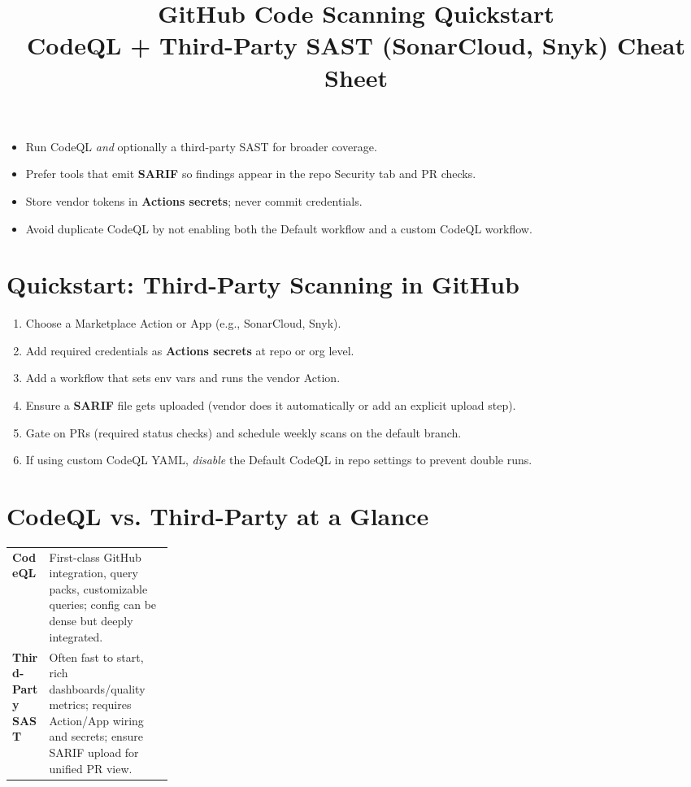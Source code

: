 \documentclass[11pt]{article}
\title{\vspace{-1.0em}GitHub Code Scanning Quickstart\\
\large CodeQL + Third-Party SAST (SonarCloud, Snyk) Cheat Sheet\vspace{-0.3em}}
\author{}
\date{}
\begin{document}
\maketitle

\begin{tcolorbox}[title=TL;DR, colframe=OliveGreen]
\begin{itemize}
  \item Run CodeQL \emph{and} optionally a third-party SAST for broader coverage.
  \item Prefer tools that emit \textbf{SARIF} so findings appear in the repo Security tab and PR checks.
  \item Store vendor tokens in \textbf{Actions secrets}; never commit credentials.
  \item Avoid duplicate CodeQL by not enabling both the Default workflow and a custom CodeQL workflow.
\end{itemize}
\end{tcolorbox}

\section*{Quickstart: Third-Party Scanning in GitHub}
\begin{enumerate}
  \item Choose a Marketplace Action or App (e.g., SonarCloud, Snyk).
  \item Add required credentials as \textbf{Actions secrets} at repo or org level.
  \item Add a workflow that sets env vars and runs the vendor Action.
  \item Ensure a \textbf{SARIF} file gets uploaded (vendor does it automatically or add an explicit upload step).
  \item Gate on PRs (required status checks) and schedule weekly scans on the default branch.
  \item If using custom CodeQL YAML, \emph{disable} the Default CodeQL in repo settings to prevent double runs.
\end{enumerate}

\section*{CodeQL vs. Third-Party at a Glance}
\begin{tcolorbox}[title=Comparison, colframe=RoyalBlue]
\begin{tabularx}{\linewidth}{>{\bfseries}p{0.23\linewidth} X}
CodeQL & First-class GitHub integration, query packs, customizable queries; config can be dense but deeply integrated.\\[0.25em]
Third-Party SAST & Often fast to start, rich dashboards/quality metrics; requires Action/App wiring and secrets; ensure SARIF upload for unified PR view.
\end{tabularx}
\end{tcolorbox}
\clearpage
\end{document}
